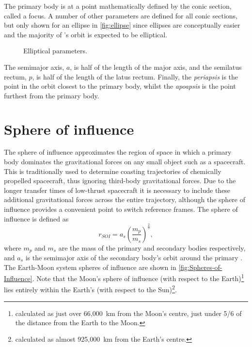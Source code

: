 The primary body is at a point mathematically defined by the conic section, called a focus. A number of other parameters are defined for all conic sections, but only shown for an ellipse in \autoref{fig:ellipse} since ellipses are conceptually easier and the majority of \BW's orbit is expected to be elliptical.

\begin{figure} 
\centering
\def\svgwidth{0.9\textwidth}

\caption{Elliptical parameters.} \label{fig:ellipse}
\end{figure}

The semimajor axis, $a$, is half of the length of the major axis, and the semilatus rectum, $p$, is half of the length of the latus rectum. Finally, the \emph{periapsis} is the point in the orbit closest to the primary body, whilst the \emph{apoapsis} is the point furthest from the primary body.




\section{Sphere of influence} \label{sec:SOI}
The sphere of influence approximates the region of space in which a primary body dominates the gravitational forces on any small object such as a spacecraft. This is traditionally used to determine coasting trajectories of chemically propelled spacecraft, thus ignoring third-body gravitational forces. Due to the longer transfer times of low-thrust spacecraft it is necessary to include these additional gravitational forces across the entire trajectory, although the sphere of influence provides a convenient point to switch reference frames. The sphere of influence is defined as
\begin{equation}
r_{SOI}=a_{s}\left(\frac{m_{p}}{m_{s}}\right)^{\frac{2}{5}} \label{eq:SOI},
\end{equation}
where $m_{p}$ and $m_{s}$ are the mass of the primary and secondary bodies respectively, and $a_{s}$ is the semimajor axis of the secondary body's orbit around the primary \parencite{Kemble2006}. The Earth-Moon system spheres of influence are shown in \autoref{fig:Spheres-of-Influence}.
 Note that the Moon's sphere of influence (with respect to the Earth)\footnote{calculated as just over 66,000~km from the Moon's centre, just under 5/6 of the distance from the Earth to the Moon.} lies entirely within the Earth's (with respect to the Sun)\footnote{calculated as almost 925,000~km from the Earth's centre.}.

